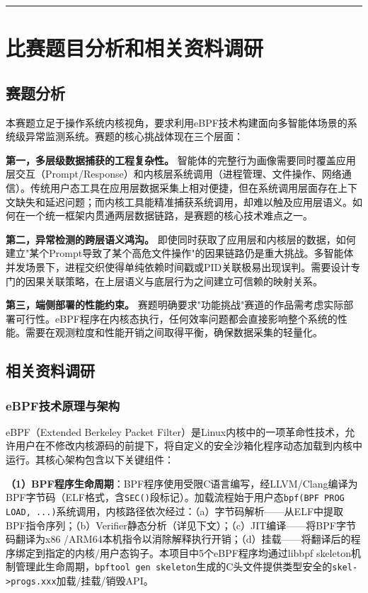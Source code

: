 \documentclass[a4paper]{ctexart}
\makeatletter
\renewcommand{\_}{%
  \ifmmode
    \nfss@text{\textunderscore}%
  \else
    \textunderscore\discretionary{}{}{}%
  \fi}
\makeatother
\begin{document}
\bigskip
\hrule
\bigskip


\section{比赛题目分析和相关资料调研}



\subsection{赛题分析}



本赛题立足于操作系统内核视角，要求利用eBPF技术构建面向多智能体场景的系统级异常监测系统。赛题的核心挑战体现在三个层面：


\textbf{第一，多层级数据捕获的工程复杂性。} 智能体的完整行为画像需要同时覆盖应用层交互（Prompt/Response）和内核层系统调用（进程管理、文件操作、网络通信）。传统用户态工具在应用层数据采集上相对便捷，但在系统调用层面存在上下文缺失和延迟问题；而内核工具能精准捕获系统调用，却难以触及应用层语义。如何在一个统一框架内贯通两层数据链路，是赛题的核心技术难点之一。


\textbf{第二，异常检测的跨层语义鸿沟。} 即使同时获取了应用层和内核层的数据，如何建立"某个Prompt导致了某个高危文件操作"的因果链路仍是重大挑战。多智能体并发场景下，进程交织使得单纯依赖时间戳或PID关联极易出现误判。需要设计专门的因果关联策略，在上层语义与底层行为之间建立可信赖的映射关系。


\textbf{第三，端侧部署的性能约束。} 赛题明确要求"功能挑战"赛道的作品需考虑实际部署可行性。eBPF程序在内核态执行，任何效率问题都会直接影响整个系统的性能。需要在观测粒度和性能开销之间取得平衡，确保数据采集的轻量化。


\subsection{相关资料调研}



\subsubsection{eBPF技术原理与架构}



eBPF（Extended Berkeley Packet Filter）是Linux内核中的一项革命性技术，允许用户在不修改内核源码的前提下，将自定义的安全沙箱化程序动态加载到内核中运行。其核心架构包含以下关键组件：


\textbf{（1）BPF程序生命周期}：BPF程序使用受限C语言编写，经LLVM/Clang编译为BPF字节码（ELF格式，含\texttt{SEC()}段标记）。加载流程始于用户态\texttt{bpf(BPF\_PROG\_LOAD, ...)}系统调用，内核路径依次经过：（a）字节码解析——从ELF中提取BPF指令序列；（b）Verifier静态分析（详见下文）；（c）JIT编译——将BPF字节码翻译为x86\_64/ARM64本机指令以消除解释执行开销；（d）挂载——将翻译后的程序绑定到指定的内核/用户态钩子。本项目中5个eBPF程序均通过libbpf skeleton机制管理此生命周期，\texttt{bpftool gen skeleton}生成的C头文件提供类型安全的\texttt{skel->progs.xxx}加载/挂载/销毁API。
\end{document}
